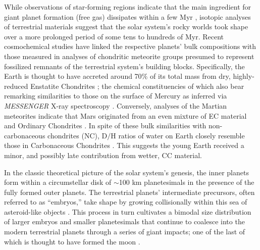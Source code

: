 \documentclass[trackchanges,twocolumn]{aastex}
\begin{document}
While observations of star-forming regions indicate that the main ingredient for giant planet formation (free gas) dissipates within a few Myr \citep[though some observed disks are much older:][]{hernandez07}, isotopic analyses of terrestrial materials \citep[e.g.:][]{kleine09} suggest that the solar system's rocky worlds took shape over a more prolonged period of some tens to hundreds of Myr.  Recent cosmochemical studies have linked the respective planets' bulk compositions with those measured in analyses of chondritic meteorite groups presumed to represent fossilized remnants of the terrestrial system's building blocks.  Specifically, the Earth is thought to have accreted around 70$\%$ of its total mass \citep{dauphas17} from dry, highly-reduced Enstatite Chondrites \citep[EC,][]{javoy10}; the chemical constituencies of which also bear remarking similarities to those on the surface of Mercury as inferred via \textit{MESSENGER} X-ray spectroscopy \citep{nittler11}.  Conversely, analyses of the Martian meteorites indicate that Mars originated from an even mixture of EC material and Ordinary Chondrites \citep[OC,][]{tang14}.  In spite of these bulk similarities with non-carbonaceous chondrites (NC), D$/$H ratios of water on Earth closely resemble those in Carbonaceous Chondrites \citep[CC, e.g.:][]{daphaus00}.  This suggests the young Earth received a minor, and possibly late \citep{rubie15} contribution from wetter, CC material.

 In the classic theoretical picture of the solar system's genesis, the inner planets form within a circumstellar disk of $\sim$100 km planetesimals in the presence of the fully formed outer planets.  The terrestrial planets' intermediate precursors, often referred to as ``embryos,'' take shape by growing collisionally within this sea of asteroid-like objects \citep{koko_ida_96}.  This process in turn cultivates a bimodal size distribution of larger embryos and smaller planetesimals that continue to coalesce into the modern terrestrial planets through a series of giant impacts; one of the last of which is thought to have formed the moon \citep{wetherill78}.
\end{document}
